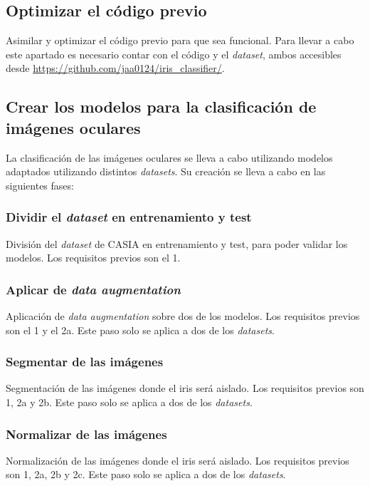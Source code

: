 \subsection{Optimizar el código previo}

Asimilar y optimizar el código previo para que sea funcional. Para llevar a cabo este apartado es necesario contar con el código y el \textit{dataset}, ambos accesibles desde \url{https://github.com/jaa0124/iris_classifier/}.

\subsection{Crear los modelos para la clasificación de imágenes oculares}

La clasificación de las imágenes oculares se lleva a cabo utilizando modelos adaptados utilizando distintos \textit{datasets}. Su creación se lleva a cabo en las siguientes fases:

\subsubsection{Dividir el \textit{dataset} en entrenamiento y test}

División del \textit{dataset} de CASIA en entrenamiento y test, para poder validar los modelos. Los requisitos previos son el 1.

\subsubsection{Aplicar de \textit{data augmentation}}

Aplicación de \textit{data augmentation} sobre dos de los modelos. Los requisitos previos son el 1 y el 2a. Este paso solo se aplica a dos de los \textit{datasets}.

\subsubsection{Segmentar de las imágenes}

Segmentación de las imágenes donde el iris será aislado. Los requisitos previos son 1, 2a y 2b. Este paso solo se aplica a dos de los \textit{datasets}.

\subsubsection{Normalizar de las imágenes}

Normalización de las imágenes donde el iris será aislado. Los requisitos previos son 1, 2a, 2b y 2c. Este paso solo se aplica a dos de los \textit{datasets}.

